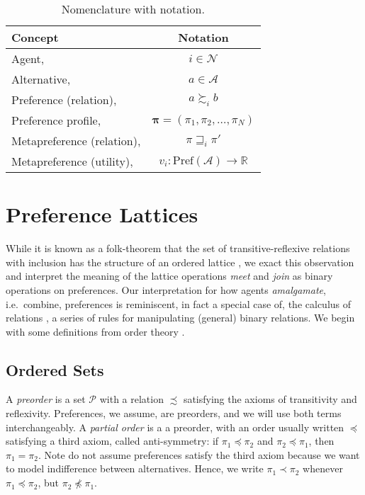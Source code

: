 \documentclass[conference]{ieeeconf}
\newcommand{\R}{\mathbb{R}}
\newcommand{\N}{\mathcal{N}}
\newcommand{\A}{\mathcal{A}}
\renewcommand{\P}{\mathcal{P}}
\newcommand{\Pref}{\mathrm{Pref}}
\newcommand{\prefers}{\succsim}
\newcommand{\metaprefers}{\sqsupseteq}
\begin{document}
\begin{table}
\centering
\caption{Nomenclature with notation.}
\label{table:notation}
\begin{tabular}{p{5cm}c}
\toprule
Concept & Notation \\
\midrule
Agent, & $i \in \N$ \\
Alternative, & $a \in \A$ \\
Preference (relation), & $a \prefers_i b$ \\
Preference profile, & $\boldsymbol{\pi} = \left(\pi_1,\pi_2,\dots,\pi_N\right)$ \\
Metapreference (relation), & $\pi \metaprefers_i \pi'$ \\
Metapreference (utility), & $v_i: \Pref(\A) \to \R$\\
\bottomrule
\end{tabular}
\end{table}

\section{Preference Lattices}
\label{sec:algebraic}

While it is known as a folk-theorem that the set of transitive-reflexive relations with inclusion has the structure of an ordered lattice \cite{birkhoff1940}, we exact this observation and interpret the meaning of the lattice operations \emph{meet} and \emph{join} as binary operations on preferences. Our interpretation for how agents \emph{amalgamate}, i.e.~combine, preferences is reminiscent, in fact a special case of, the calculus of relations \cite{tarski1941}, a series of rules for manipulating (general) binary relations. We begin with some definitions from order theory \cite{roman}.

\subsection{Ordered Sets}

A \emph{preorder} is a set $\P$ with a relation $\precsim$ satisfying the axioms of transitivity and reflexivity. Preferences, we assume, are preorders, and we will use both terms interchangeably. A \emph{partial order} is a a preorder, with an order usually written $\preceq$ satisfying a third axiom, called anti-symmetry: if $\pi_1 \preceq \pi_2$ and $\pi_2 \preceq \pi_1$, then $\pi_1 = \pi_2$. Note do not assume preferences satisfy the third axiom because we want to model indifference between alternatives. Hence, we write $\pi_1 \prec \pi_2$ whenever $\pi_1 \preceq \pi_2$, but $\pi_2 \not \preceq \pi_1$.
\end{document}
